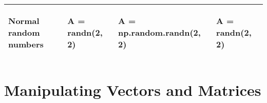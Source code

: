 \documentclass[10pt, landscape]{article}
\newenvironment{Shaded}{}{}
\newcommand{\DecValTok}[1]{\textcolor[rgb]{0.25,0.63,0.44}{{#1}}}
\newcommand{\FloatTok}[1]{\textcolor[rgb]{0.25,0.63,0.44}{{#1}}}
\newcommand{\OperatorTok}[1]{\textcolor[rgb]{0.40,0.40,0.40}{{#1}}}
\newcommand{\NormalTok}[1]{{#1}}
\begin{document}
\begin{multicols*}{2}
\begin{tabular}[ ]{@{}llll@{}}
\begin{minipage}[t]{0.24\columnwidth}
Normal random numbers\strut
\end{minipage} & \begin{minipage}[t]{0.20\columnwidth}\raggedright\strut
\begin{Shaded}
\begin{Highlighting}[]
\NormalTok{A = randn(}\FloatTok{2}\NormalTok{, }\FloatTok{2}\NormalTok{)}
\end{Highlighting}
\end{Shaded}
\strut
\end{minipage} & \begin{minipage}[t]{0.25\columnwidth}\raggedright\strut
\begin{Shaded}
\begin{Highlighting}[]
\NormalTok{A }\OperatorTok{=} \NormalTok{np.random.randn(}\DecValTok{2}\NormalTok{, }\DecValTok{2}\NormalTok{)}
\end{Highlighting}
\end{Shaded}
\strut
\end{minipage} & \begin{minipage}[t]{0.20\columnwidth}\raggedright\strut
\begin{Shaded}
\begin{Highlighting}[]
\NormalTok{A = randn(}\FloatTok{2}\NormalTok{, }\FloatTok{2}\NormalTok{)}
\end{Highlighting}
\end{Shaded}
\strut
\end{minipage}\tabularnewline
\bottomrule
\end{tabular}

\section{Manipulating Vectors and
Matrices}\label{manipulating-vectors-and-matrices}


\end{multicols*}
\end{document}
